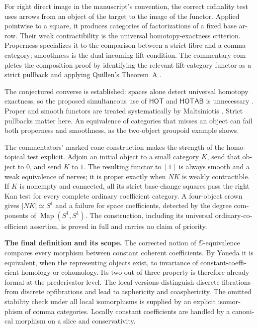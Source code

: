 \begin{otherlanguage}{english}
For right direct image in the manuscript's convention, the correct cofinality test uses arrows from an object of the target to the image of the functor. Applied pointwise to a square, it produces categories of factorizations of a fixed base arrow. Their weak contractibility is the universal homotopy-exactness criterion. Properness specializes it to the comparison between a strict fibre and a comma category; smoothness is the dual incoming-lift condition. The commentary completes the composition proof by identifying the relevant lift-category functor as a strict pullback and applying Quillen's Theorem~A \citep[\S1]{Quillen1973}.

The conjectured converse is established: spaces alone detect universal homotopy exactness, so the proposed simultaneous use of $\mathsf{HOT}$ and $\mathsf{HOTAB}$ is unnecessary \citep[Theorem~3.16]{GrothPontoShulman2014}. Proper and smooth functors are treated systematically by Maltsiniotis \citep[Theorem~1.2]{Maltsiniotis2005Asphericite}. Strict pullbacks matter here. An equivalence of categories that misses an object can fail both properness and smoothness, as the two-object groupoid example shows.

The commentators' marked cone construction makes the strength of the homotopical test explicit. Adjoin an initial object to a small category $K$, send that object to $0$, and send $K$ to $1$. The resulting functor to $[1]$ is always smooth and a weak equivalence of nerves; it is proper exactly when $NK$ is weakly contractible. If $K$ is nonempty and connected, all its strict base-change squares pass the right Kan test for every complete ordinary coefficient category. A four-object crown gives $|NK|\simeq S^1$ and a failure for space coefficients, detected by the degree components of $\operatorname{Map}(S^1,S^1)$. The construction, including its universal ordinary-coefficient assertion, is proved in full and carries no claim of priority.

\medskip\noindent\textbf{The final definition and its scope.}
The corrected notion of $\DD$-equivalence compares every morphism between constant coherent coefficients. By Yoneda it is equivalent, when the representing objects exist, to invariance of constant-coefficient homology or cohomology. Its two-out-of-three property is therefore already formal at the prederivator level. The local versions distinguish discrete fibrations from discrete opfibrations and lead to asphericity and coasphericity. The omitted stability check under all local isomorphisms is supplied by an explicit isomorphism of comma categories. Locally constant coefficients are handled by a canonical morphism on a slice and conservativity.


\end{otherlanguage}
